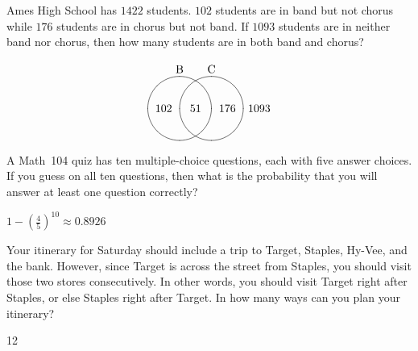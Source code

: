 \documentclass[addpoints,12pt]{exam}
\begin{document}
\begin{questions}
\begin{solution}
\end{solution}

\question[12] Ames High School has $1422$ students.
$102$ students are in band but not chorus while
$176$ students are in chorus but not band.
If $1093$ students are in neither band nor chorus,
then how many students are in both band and chorus?
\begin{solution}
\[\begin{xy}<.5cm,0cm>:
(-1,2)*+!D{\text{B}};
(1,2)*+!D{\text{C}};
(-1,0)*\cir<1cm>{};
(1,0)*\cir<1cm>{};
(0,0)*{51};
(-2,0)*{102};
(2,0)*{176};
(4,0)*{1093};
\end{xy}\]
\end{solution}

\question[12] A Math~104 quiz has ten multiple-choice
questions, each with five answer choices. If you guess on all
ten questions, then what is the probability that you will answer at
least one question correctly?
\begin{solution}
$1-\left(\frac{4}{5}\right)^{10}\approx 0.8926$
\end{solution}

\question[15] Your itinerary for Saturday should
include a trip to Target, Staples, Hy-Vee, and the bank.
However, since Target is across the street from Staples,
you should visit those two stores consecutively. In other
words, you should visit Target right after Staples, or else
Staples right after Target. In how many ways
can you plan your itinerary?
\begin{solution}12\end{solution}

\end{questions}

\vfill\ifprintanswers\else\begin{center}\gradetable[h][questions]\end{center}\fi
\end{document}
